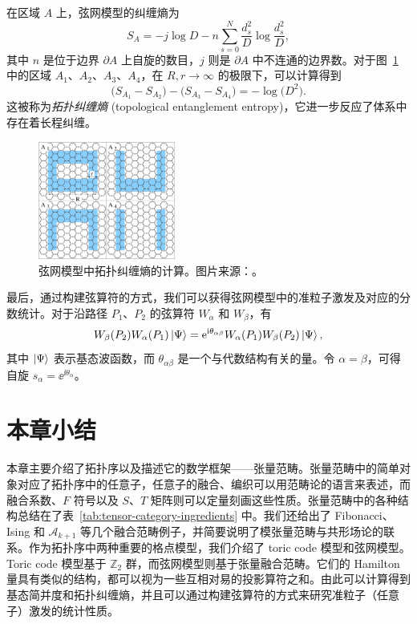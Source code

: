在区域 $A$ 上，弦网模型的纠缠熵为\cite{levin2006detecting}
\begin{equation}
  S_A = -j \log D - n \sum_{s=0}^N \frac{d_s^2}{D} \log \frac{d_s^2}{D},
\end{equation}
其中 $n$ 是位于边界 $\partial A$ 上自旋的数目，$j$ 则是 $\partial A$ 中不连通的边界数。对于图~\ref{fig:topological-entanglement-entropy} 中的区域 $A_1$、$A_2$、$A_3$、$A_4$，在 $R,r\to\infty$ 的极限下，可以计算得到
\begin{equation}
  \bigl( S_{A_1} - S_{A_2} \bigr) - \bigl( S_{A_3} - S_{A_4} \bigr) = -\log \bigl( D^2 \bigr).
\end{equation}
这被称为\emph{拓扑纠缠熵} (topological entanglement entropy)，它进一步反应了体系中存在着长程纠缠。

\begin{figure}[htb]
  \centering
  \includegraphics[width=0.4\textwidth]{images/topological-entanglement-entropy.pdf}
  \caption[弦网模型中拓扑纠缠熵的计算]{弦网模型中拓扑纠缠熵的计算。图片来源：\parencite{levin2006detecting}。}
  \label{fig:topological-entanglement-entropy}
\end{figure}

最后，通过构建弦算符的方式，我们可以获得弦网模型中的准粒子激发及对应的分数统计\cite{levin2005string,lin2014generalizations}。对于沿路径 $P_1$、$P_2$ 的弦算符 $W_\alpha$ 和 $W_\beta$，有
\begin{equation}
  W_\beta(P_2) W_\alpha(P_1) \ket{\Psi} = \ee^{\ii\theta_{\alpha\beta}} W_\alpha(P_1) W_\beta(P_2) \ket{\Psi},
\end{equation}
其中 $\ket{\Psi}$ 表示基态波函数，而 $\theta_{\alpha\beta}$ 是一个与代数结构有关的量。令 $\alpha=\beta$，可得自旋 $s_\alpha=\ee^{\ii\theta_\alpha}$。

\section{本章小结}

本章主要介绍了拓扑序以及描述它的数学框架——张量范畴。张量范畴中的简单对象对应了拓扑序中的任意子，任意子的融合、编织可以用范畴论的语言来表述，而融合系数、$F$ 符号以及 $S$、$T$ 矩阵则可以定量刻画这些性质。张量范畴中的各种结构总结在了表~\ref{tab:tensor-category-ingredients} 中。我们还给出了 Fibonacci、Ising 和 $\mathcal{A}_{k+1}$ 等几个融合范畴例子，并简要说明了模张量范畴与共形场论的联系。作为拓扑序中两种重要的格点模型，我们介绍了 toric code 模型和弦网模型。Toric code 模型基于 $\mathbb{Z}_2$ 群，而弦网模型则基于张量融合范畴。它们的 Hamilton 量具有类似的结构，都可以视为一些互相对易的投影算符之和。由此可以计算得到基态简并度和拓扑纠缠熵，并且可以通过构建弦算符的方式来研究准粒子（任意子）激发的统计性质。

